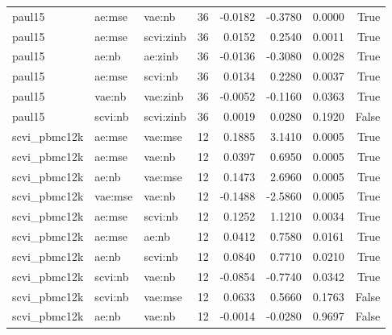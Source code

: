 \begin{tabular}{lllrrrrr}
paul15 & ae:mse & vae:nb & 36 & -0.0182 & -0.3780 & 0.0000 & True \\
paul15 & ae:mse & scvi:zinb & 36 & 0.0152 & 0.2540 & 0.0011 & True \\
paul15 & ae:nb & ae:zinb & 36 & -0.0136 & -0.3080 & 0.0028 & True \\
paul15 & ae:mse & scvi:nb & 36 & 0.0134 & 0.2280 & 0.0037 & True \\
paul15 & vae:nb & vae:zinb & 36 & -0.0052 & -0.1160 & 0.0363 & True \\
paul15 & scvi:nb & scvi:zinb & 36 & 0.0019 & 0.0280 & 0.1920 & False \\
scvi\_pbmc12k & ae:mse & vae:mse & 12 & 0.1885 & 3.1410 & 0.0005 & True \\
scvi\_pbmc12k & ae:mse & vae:nb & 12 & 0.0397 & 0.6950 & 0.0005 & True \\
scvi\_pbmc12k & ae:nb & vae:mse & 12 & 0.1473 & 2.6960 & 0.0005 & True \\
scvi\_pbmc12k & vae:mse & vae:nb & 12 & -0.1488 & -2.5860 & 0.0005 & True \\
scvi\_pbmc12k & ae:mse & scvi:nb & 12 & 0.1252 & 1.1210 & 0.0034 & True \\
scvi\_pbmc12k & ae:mse & ae:nb & 12 & 0.0412 & 0.7580 & 0.0161 & True \\
scvi\_pbmc12k & ae:nb & scvi:nb & 12 & 0.0840 & 0.7710 & 0.0210 & True \\
scvi\_pbmc12k & scvi:nb & vae:nb & 12 & -0.0854 & -0.7740 & 0.0342 & True \\
scvi\_pbmc12k & scvi:nb & vae:mse & 12 & 0.0633 & 0.5660 & 0.1763 & False \\
scvi\_pbmc12k & ae:nb & vae:nb & 12 & -0.0014 & -0.0280 & 0.9697 & False \\
\bottomrule
\end{tabular}
